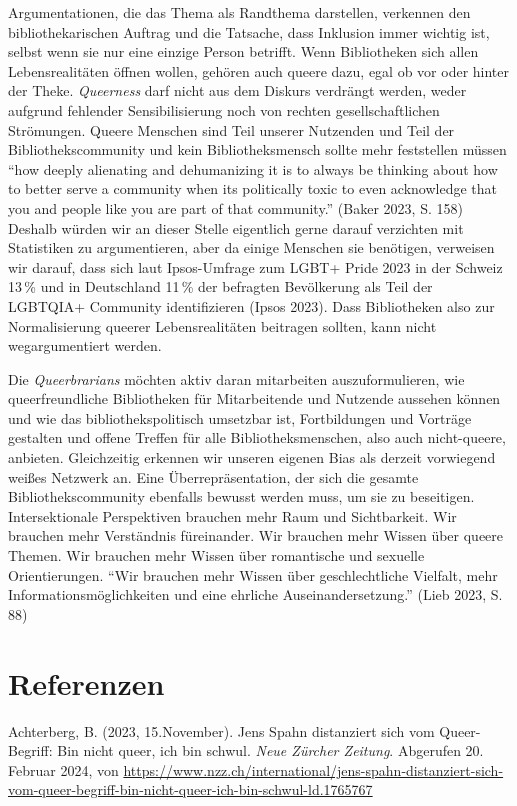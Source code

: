 \documentclass[a4paper,
fontsize=11pt,
oneside,
numbers=noperiodatend,
parskip=half-,
bibliography=totoc,
final
]{scrartcl}
\begin{document}
Argumentationen, die das Thema als Randthema darstellen, verkennen den
bibliothekarischen Auftrag und die Tatsache, dass Inklusion immer
wichtig ist, selbst wenn sie nur eine einzige Person betrifft. Wenn
Bibliotheken sich allen Lebensrealitäten öffnen wollen, gehören auch
queere dazu, egal ob vor oder hinter der Theke. \emph{Queerness} darf
nicht aus dem Diskurs verdrängt werden, weder aufgrund fehlender
Sensibilisierung noch von rechten gesellschaftlichen Strömungen. Queere
Menschen sind Teil unserer Nutzenden und Teil der Bibliothekscommunity
und kein Bibliotheksmensch sollte mehr feststellen müssen \enquote{how
deeply alienating and dehumanizing it is to always be thinking about how
to better serve a community when it\textquotesingle s politically toxic
to even acknowledge that you and people like you are part of that
community.} (Baker 2023, S. 158) Deshalb würden wir an dieser Stelle
eigentlich gerne darauf verzichten mit Statistiken zu argumentieren,
aber da einige Menschen sie benötigen, verweisen wir darauf, dass sich
laut Ipsos-Umfrage zum LGBT+ Pride 2023 in der Schweiz 13\,\% und in
Deutschland 11\,\% der befragten Bevölkerung als Teil der LGBTQIA+
Community identifizieren (Ipsos 2023). Dass Bibliotheken also zur
Normalisierung queerer Lebensrealitäten beitragen sollten, kann nicht
wegargumentiert werden.

Die \emph{Queerbrarians} möchten aktiv daran mitarbeiten
auszuformulieren, wie queerfreundliche Bibliotheken für Mitarbeitende
und Nutzende aussehen können und wie das bibliothekspolitisch umsetzbar
ist, Fortbildungen und Vorträge gestalten und offene Treffen für alle
Bibliotheksmenschen, also auch nicht-queere, anbieten. Gleichzeitig
erkennen wir unseren eigenen Bias als derzeit vorwiegend weißes Netzwerk
an. Eine Überrepräsentation, der sich die gesamte Bibliothekscommunity
ebenfalls bewusst werden muss, um sie zu beseitigen. Intersektionale
Perspektiven brauchen mehr Raum und Sichtbarkeit. Wir brauchen mehr
Verständnis füreinander. Wir brauchen mehr Wissen über queere Themen.
Wir brauchen mehr Wissen über romantische und sexuelle Orientierungen.
\enquote{Wir brauchen mehr Wissen über geschlechtliche Vielfalt, mehr
Informationsmöglichkeiten und eine ehrliche Auseinandersetzung.} (Lieb
2023, S. 88)

\section{Referenzen}\label{referenzen}

Achterberg, B. (2023, 15.November). Jens Spahn distanziert sich vom
Queer-Begriff: Bin nicht queer, ich bin schwul. \emph{Neue Zürcher
Zeitung}. Abgerufen 20. Februar 2024, von
\url{https://www.nzz.ch/international/jens-spahn-distanziert-sich-vom-queer-begriff-bin-nicht-queer-ich-bin-schwul-ld.1765767}
\end{document}
